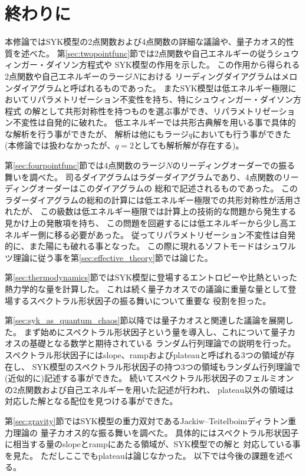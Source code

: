 \section{終わりに\label{sec:conclusion}}
本修論ではSYK模型の2点関数および4点関数の詳細な議論や、量子カオス的性質を述べた。
第\ref{sec:twopointfunc}節では2点関数や自己エネルギーの従うシュウィンガー・ダイソン方程式や
SYK模型の作用を示した。
この作用から得られる2点関数や自己エネルギーのラージ$N$における
リーディングダイアグラムはメロンダイアグラムと呼ばれるものであった。
またSYK模型は低エネルギー極限においてリパラメトリゼーション不変性を持ち、特にシュウィンガー・ダイソン方程式
の解として共形対称性を持つものを選ぶ事ができ、リパラメトリゼーション不変性は自発的に破れた。
低エネルギーでは共形古典解を用いる事で具体的な解析を行う事ができたが、
解析は他にもラージ$q$においても行う事ができた(本修論では扱わなかったが、$q=2$としても解析解が存在する)。

第\ref{sec:fourpointfunc}節では4点関数のラージ$N$のリーディングオーダーでの振る舞いを調べた。
司るダイアグラムはラダーダイアグラムであり、4点関数のリーディングオーダーはこのダイアグラムの
総和で記述されるものであった。
このラダーダイアグラムの総和の計算には低エネルギー極限での共形対称性が活用されたが、
この級数は低エネルギー極限では計算上の技術的な問題から発生する見かけ上の発散項を持ち、
この問題を回避するには低エネルギーから少し高エネルギー側に移る必要があった。
従ってリパラメトリゼーション不変性は自発的に、また陽にも破れる事となった。
この際に現れるソフトモードはシュワルツ理論に従う事を第\ref{sec:effective_theory}節では論じた。

第\ref{sec:thermodynamics}節ではSYK模型に登場するエントロピーや比熱といった熱力学的な量を計算した。
これは続く量子カオスでの議論に重量な量として登場するスペクトラル形状因子の振る舞いについて重要な
役割を担った。

第\ref{sec:syk_as_quantum_chaos}節以降では量子カオスと関連した議論を展開した。
まず始めにスペクトラル形状因子という量を導入し、これについて量子カオスの基礎となる数学と期待されている
ランダム行列理論での説明を行った。
スペクトラル形状因子にはslope、rampおよびplateauと呼ばれる3つの領域が存在し、
SYK模型のスペクトラル形状因子の持つ3つの領域もランダム行列理論で(近似的に)記述する事ができた。
続いてスペクトラル形状因子のフェルミオンの2点関数および自己エネルギーを用いた記述が行われ、
plateau以外の領域は対応した解となる配位を見つける事ができた。

第\ref{sec:gravity}節ではSYK模型の重力双対であるJackiw--Teitelboimディラトン重力理論の
量子カオス的な振る舞いを調べた。
具体的にはスペクトラル形状因子に相当する量のslopeとrampにあたる領域が、SYK模型での解と
対応している事を見た。
ただしここでもplateauは論じなかった。
以下では今後の課題を述べる。

